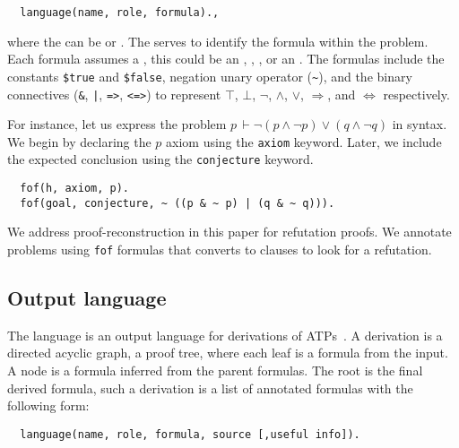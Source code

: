 \documentclass[../main.tex]{subfiles}
\begin{document}
\begin{verbatim}
  language(name, role, formula).,
\end{verbatim}

where the  can be  or . The 
serves to identify the formula within the problem. Each formula
assumes a , this could be an ,
, ,  or an .
The formulas include the constants \verb!$true! and \verb!$false!, negation
unary operator (\verb!~!), and the binary connectives (\verb!&!, \verb!|!,
\verb!=>!, \verb!<=>!) to represent $⊤$, $⊥$, $¬$, $∧$, $∨$, $⇒$,
and $⇔$ respectively.

\begin{myexample}
For instance, let us express the problem
$p\, ⊢ ¬  (p ∧ ¬ p) ∨ (q ∧ ¬ q)$
in \TPTP syntax. We begin by declaring the $p$ axiom using the \verb!axiom!
keyword. Later, we include the expected conclusion using the
\verb!conjecture! keyword.

\begin{verbatim}
  fof(h, axiom, p).
  fof(goal, conjecture, ~ ((p & ~ p) | (q & ~ q))).
\end{verbatim}

\end{myexample}

\begin{myremark}
We address proof-reconstruction in this paper for refutation proofs.
We annotate  problems using \verb!fof! formulas that
\Metis converts to  clauses to look for a refutation.
\end{myremark}

\subsection{Output language}
\label{ssec:output-language}

The \TSTP language is an output language for derivations of
ATPs~\cite{Sutcliffe-Schulz-Claessen-VanGelder-2006}.
A \TSTP derivation is a directed acyclic graph, a proof tree,
where each leaf is a formula from the \TPTP input. A node is a formula
inferred from the parent formulas. The root is the final derived formula,
such a derivation is a list of annotated formulas with the following form:

\begin{verbatim}
  language(name, role, formula, source [,useful info]).
\end{verbatim}
\end{document}
